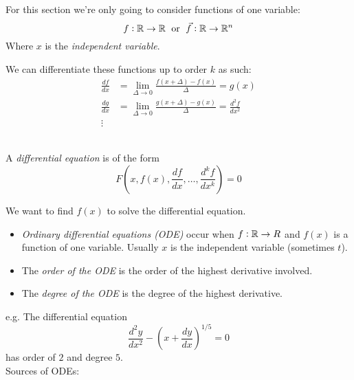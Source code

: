 \documentclass[10pt]{scrartcl}
\begin{document}
\TableofContents

\setcounter{page}{3}


\vspace*{5pt}


For 
this section we're only going to consider functions of one variable:
\[f: \mathbb{R} \to \mathbb{R} \;\text{ or }\; \vec{f}: \mathbb{R} \to \mathbb{R}^n\]	
Where $x$ is the \emph{independent variable}. 

We can differentiate these functions up to order $k$ as such:
\[
\begin{aligned}
  \frac{df}{dx} &= \lim_{\Delta \to 0} \frac{f(x + \Delta) - f(x)}{\Delta} = g(x)\\[0.2cm]
  \frac{dg}{dx} &= \lim_{\Delta \to 0} \frac{g(x + \Delta) - g(x)}{\Delta} = \frac{d^2f}{dx^2}\\
  \vdots 
\end{aligned}
\]~


\begin{definition}
A \emph{differential equation} is of the form
\[F\left(x,f(x),\frac{df}{dx},\dots,\frac{d^kf}{dx^k}\right) = 0\]
\end{definition}
We want to find $f(x)$ to solve the differential equation.


\begin{itemize}
\item \emph{Ordinary differential equations (ODE)} occur when $f: \mathbb{R} \to R$ and $f(x)$ is a function of one variable. Usually $x$ is the independent variable (sometimes $t$). 

\item The \emph{order of the ODE} is the order of the highest derivative involved. 
\item The \emph{degree of the ODE} is the degree of the highest derivative.
\end{itemize}

e.g. The differential equation \[\dfrac{d^2y}{dx^2} - \left(x + \dfrac{dy}{dx}\right)^{1/5} = 0\]
 has order of $2$ and degree $5$.~\\ 


Sources of ODEs:
\end{document}
